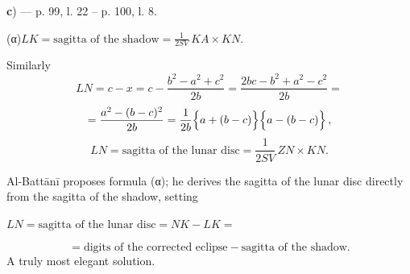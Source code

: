 \documentclass[11pt]{article}
\newcommand{\Pg}[1]{\marginpar{\footnotesize\color{gray}#1}}
\begin{document}
\par\begin{center}\textbf{c}) — p. 99, l. 22 – p. 100, l. 8.\end{center}
\par [\emph{The computation of the area of the lunar disc that is covered.}\par
\begin{center}\end{center}
\par \Pg{I 275}I do not remember having found the author's rules for computing the \emph{sagittae} of the moon and the shadow in other writers; they can be proved in this way. Al-Battānī says that the sagitta LK of the shadow $= \frac{KA \times KN}{2\,SV}$. Let \emph{a} be the semidiameter of the shadow, \emph{c} the semidiameter of the moon, \emph{b} = VS the distance of the centres. This distance is divided by the common chord BC into two parts, SL = \emph{y} and LV = \emph{x}; so \emph{x} + \emph{y} = \emph{b}. Then Euclid's well-known theorem (II, 13) teaches that in the triangle SBV \[ a^{2} = b^{2} + c^{2} - 2b\cdot x \] \[ c^{2} = b^{2} + a^{2} - 2b\cdot y \] so \[ x = \frac{b^{2} - a^{2} + c^{2}}{2b}\,, \qquad y = \frac{b^{2} + a^{2} - c^{2}}{2b}\,. \] It is now easy to compute both sagittae, LK = \emph{a} − \emph{y} and LN = \emph{c} − \emph{x}. Substituting the values of the lines \emph{y} and \emph{x} just found: \[ LK = a - y = a - \frac{b^{2} + a^{2} - c^{2}}{2b} = \frac{2ab - b^{2} - a^{2} + c^{2}}{2b} = \] \[ = \frac{c^{2} - (a - b)^{2}}{2b} = \frac{1}{2b}\Bigl\{c + (b - a)\Bigr\}\Bigl\{c - (b - a)\Bigr\}\,, \] whence \par\noindent\hspace*{1.5em}\makebox[2.6em][l]{({\greekfont α})}$\displaystyle LK = \text{sagitta of the shadow} = \frac{1}{2SV}\,KA \times KN.$\par Similarly \[ LN = c - x = c - \frac{b^{2} - a^{2} + c^{2}}{2b} = \frac{2bc - b^{2} + a^{2} - c^{2}}{2b} = \] \[ = \frac{a^{2} - (b - c)^{2}}{2b} = \frac{1}{2b}\Bigl\{a + (b - c)\Bigr\}\Bigl\{a - (b - c)\Bigr\}\,, \] \[ LN = \text{sagitta of the lunar disc} = \frac{1}{2SV}\,ZN \times KN. \]\par
\par Al-Battānī proposes formula ({\greekfont α}); he derives the sagitta of the lunar disc directly from the sagitta of the shadow, setting \par\noindent\hspace*{1.5em}$\displaystyle LN = \text{sagitta of the lunar disc} = NK - LK =$\par \[ = \text{digits of the corrected eclipse} - \text{sagitta of the shadow}. \] A truly most elegant solution.\par
\end{document}
